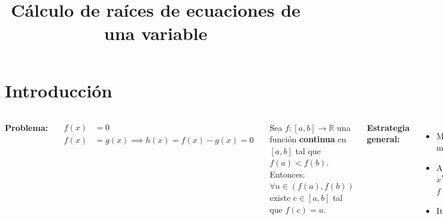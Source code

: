 \documentclass[9pt, aspectratio=169]{beamer}
\title{Cálculo de raíces de ecuaciones de una variable}
\subtitle{}
\begin{document}
\maketitle

\section{Introducción}

\begin{frame}
\begin{columns}[t]
\cx
\textbf{Problema:}

\begin{equation*}
    \begin{split}
        f(x) &= 0 \\
        f(x) &= g(x) \implies h(x) = f(x) - g(x) = 0
    \end{split} 
\end{equation*}

\begin{theorem}
Sea $f: [a, b] \rightarrow \mathbb{R}$ una función \textbf{continua} en $[a, b]$ tal que $f(a) < f(b)$. Entonces: $\forall u \in (f(a), f(b))$ existe $c \in [a, b]$ tal que $f(c) = u$.
\end{theorem}
\pause

\textbf{Estrategia general:} %
\begin{itemize}
    \item Mostrar que existe al menos una solución ($x^*$)
    \item Aislar una raíz: $D \subset \mathbb{R}$, $x^* \in D$ y $f(x) \neq 0 \; \forall x \in D \setminus \{ x^* \}$
    \item Iterar
\end{itemize}
\pause


\end{columns}
\end{frame}
\end{document}
